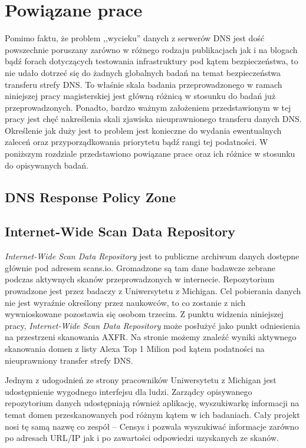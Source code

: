 \chapter{Powiązane prace}
Pomimo faktu, że problem ,,wycieku'' danych z serwerów DNS jest dość powszechnie poruszany zarówno w różnego rodzaju publikacjach\cite{uscert}
jak i na blogach bądź forach dotyczących testowania infrastruktury pod kątem bezpieczeństwa\cite{stackexchange, zonetransfer}, to nie udało dotrzeć
się do żadnych globalnych badań na temat bezpieczeństwa transferu strefy DNS. To właśnie skala badania przeprowadzonego w ramach
niniejszej pracy magisterskiej jest główną różnicą w stosunku do badań już przeprowadzonych. Ponadto, bardzo ważnym założeniem
przedstawionym w tej pracy jest chęć nakreślenia skali zjawiska nieuprawnionego transferu danych DNS. Określenie jak duży jest to
problem jest konieczne do wydania ewentualnych zaleceń oraz przyporządkowania priorytetu bądź rangi tej podatności. W poniższym
rozdziale przedstawiono powiązane prace oraz ich różnice w stosunku do opisywanych badań.

\section{DNS Response Policy Zone}


\section{Internet-Wide Scan Data Repository}
\textit{Internet-Wide Scan Data Repository} jest to publiczne archiwum danych dostępne głównie pod adresem scans.io\cite{scans.io}.
Gromadzone są tam dane badawcze zebrane podczas aktywnych skanów przeprowadzonych w internecie. Repozytorium prowadzone jest przez
badaczy z Uniwersytetu z Michigan\cite{censys}. Cel pobierania danych nie jest wyraźnie określony przez naukowców, to co zostanie z
nich wywnioskowane pozostawia się osobom trzecim. Z punktu widzenia niniejszej pracy, \textit{Internet-Wide Scan Data Repository}
może posłużyć jako punkt odniesienia na przestrzeni skanowania AXFR. Na stronie możemy znaleźć wyniki aktywnego skanowania domen z
listy Alexa Top 1 Milion\cite{alexa} pod kątem podatności na nieuprawniony transfer strefy DNS.

Jednym z udogodnień ze strony pracowników Uniwersytetu z Michigan jest udostępnienie wygodnego interfejsu dla ludzi. Zarządcy
opisywanego repozytorium danych udostępniają również aplikację, wyszukiwarkę informacji na temat domen przeskanowanych pod różnym
kątem w ich badaniach. Cały projekt nosi tę samą nazwę co zespół -- Censys\cite{censys} i pozwala wyszukiwać informacje zarówno po
adresach URL/IP jak i po zawartości odpowiedzi uzyskanych ze skanów.

